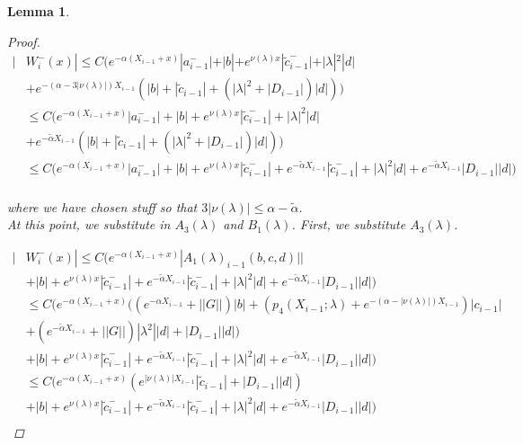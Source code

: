 \documentclass[12pt]{article}
\newtheorem{lemma}{Lemma}
\begin{document}
\begin{lemma}
\begin{proof}
\begin{align*}
| &W_i^-(x)| \leq C \Big(e^{-\alpha(X_{i-1} + x)}|a_{i-1}^-| + |b| + e^{\nu(\lambda)x} |\tilde{c}_{i-1}^-| + |\lambda|^2 |d| \\
&+ e^{-(\alpha - 3|\nu(\lambda)|)X_{i-1}} ( |b| + |\tilde{c}_{i-1}| + (|\lambda|^2 + |D_{i-1}|)|d| ) \Big) \\
&\leq C \Big(e^{-\alpha(X_{i-1} + x)}|a_{i-1}^-| + |b| + e^{\nu(\lambda)x} |\tilde{c}_{i-1}^-| + |\lambda|^2 |d| \\
&+ e^{-\tilde{\alpha} X_{i-1}} ( |b| + |\tilde{c}_{i-1}| + (|\lambda|^2 + |D_{i-1}|)|d| ) \Big) \\
&\leq C \Big(e^{-\alpha(X_{i-1} + x)}|a_{i-1}^-| + |b| + e^{\nu(\lambda)x} |\tilde{c}_{i-1}^-| + e^{-\tilde{\alpha} X_{i-1}} |\tilde{c}_{i-1}^-| + |\lambda|^2 |d| + e^{-\tilde{\alpha} X_{i-1}} |D_{i-1}||d| \Big) \\
\end{align*}

where we have chosen stuff so that $3|\nu(\lambda)| \leq \alpha - \tilde{\alpha}$.\\

At this point, we substitute in $A_3(\lambda)$ and $B_1(\lambda)$. First, we substitute $A_3(\lambda)$.

\begin{align*}
| &W_i^-(x)| \leq C \Big(e^{-\alpha(X_{i-1} + x)}|A_1(\lambda)_{i-1}(b, c, d)|| \\
&+ |b| + e^{\nu(\lambda)x} |\tilde{c}_{i-1}^-| + e^{-\tilde{\alpha} X_{i-1}} |\tilde{c}_{i-1}^-| + |\lambda|^2 |d| + e^{-\tilde{\alpha} X_{i-1}} |D_{i-1}||d| \Big) \\
&\leq C \Big(e^{-\alpha(X_{i-1} + x)}( (e^{-\alpha X_{i-1}} + ||G||) |b| + ( p_4(X_{i-1}; \lambda) + e^{-(\alpha - |\nu(\lambda)|)X_{i-1}} )|c_{i-1}| \\
&+ (e^{-\tilde{\alpha} X_{i-1}} + ||G||) |\lambda^2| |d| + |D_{i-1}||d| ) \\
&+ |b| + e^{\nu(\lambda)x} |\tilde{c}_{i-1}^-| + e^{-\tilde{\alpha} X_{i-1}} |\tilde{c}_{i-1}^-| + |\lambda|^2 |d| + e^{-\tilde{\alpha} X_{i-1}} |D_{i-1}||d| \Big) \\
&\leq C \Big(e^{-\alpha(X_{i-1} + x)}( e^{|\nu(\lambda)| X_{i-1}} |\tilde{c}_{i-1}| + |D_{i-1}||d| ) \\
&+ |b| + e^{\nu(\lambda)x} |\tilde{c}_{i-1}^-| + e^{-\tilde{\alpha} X_{i-1}} |\tilde{c}_{i-1}^-| + |\lambda|^2 |d| + e^{-\tilde{\alpha} X_{i-1}} |D_{i-1}||d| \Big) \\
\end{align*}


\end{proof}
\end{lemma}
\end{document}
